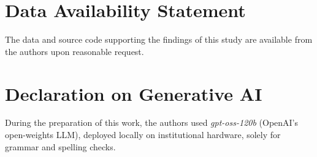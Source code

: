 \documentclass[
]{ceurart}
\begin{document}
\section{Data Availability Statement}

The data and source code supporting the findings of this study are available from the authors upon reasonable request.

\section*{Declaration on Generative AI}

During the preparation of this work, the authors used \textit{gpt-oss-120b} (OpenAI’s open-weights LLM), deployed locally on institutional hardware, solely for grammar and spelling checks.


\end{document}

